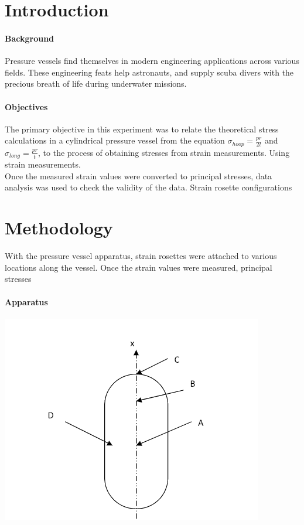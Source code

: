 \documentclass{article}
\begin{document}
\section{Introduction}

\paragraph{Background} 
Pressure vessels find themselves in modern engineering applications across various fields. These 
engineering feats help astronauts, and supply scuba divers with the precious breath of life during
underwater missions. 


\paragraph{Objectives}
The primary objective in this experiment was to relate the theoretical stress calculations in a cylindrical
pressure vessel from the equation $\sigma_{hoop} = \frac{pr}{2t} $  and  $\sigma_{long} = \frac{pr}{t} $, to the
process of obtaining stresses from strain measurements. Using strain measurements. \\ 
Once the measured strain values were converted to principal stresses, data analysis was used to 
check the validity of the data. Strain rosette configurations 

\section{Methodology}
With the pressure vessel apparatus, strain rosettes were attached to various locations along the vessel. 
Once the strain values were measured, principal stresses 
\paragraph {Apparatus}
\includegraphics{vessel}
\end{document}
